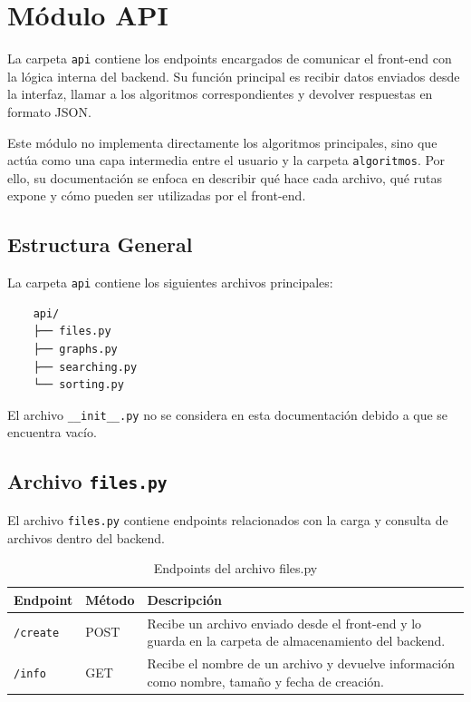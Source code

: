 \documentclass[12pt]{article}
\begin{document}

\section{Módulo API}

La carpeta \texttt{api} contiene los endpoints encargados de comunicar el front-end con la lógica interna del backend. Su función principal es recibir datos enviados desde la interfaz, llamar a los algoritmos correspondientes y devolver respuestas en formato JSON.

Este módulo no implementa directamente los algoritmos principales, sino que actúa como una capa intermedia entre el usuario y la carpeta \texttt{algoritmos}. Por ello, su documentación se enfoca en describir qué hace cada archivo, qué rutas expone y cómo pueden ser utilizadas por el front-end.

\subsection{Estructura General}

La carpeta \texttt{api} contiene los siguientes archivos principales:

\begin{verbatim}
	api/
	├── files.py
	├── graphs.py
	├── searching.py
	└── sorting.py
\end{verbatim}

El archivo \texttt{\_\_init\_\_.py} no se considera en esta documentación debido a que se encuentra vacío.

\subsection{Archivo \texttt{files.py}}

El archivo \texttt{files.py} contiene endpoints relacionados con la carga y consulta de archivos dentro del backend.

\begin{table}[H]
	\centering
	\begin{tabular}{|p{4cm}|p{4cm}|p{6cm}|}
		\hline
		\textbf{Endpoint} & \textbf{Método} & \textbf{Descripción} \\
		\hline
		\texttt{/create} & POST & Recibe un archivo enviado desde el front-end y lo guarda en la carpeta de almacenamiento del backend. \\
		\hline
		\texttt{/info} & GET & Recibe el nombre de un archivo y devuelve información como nombre, tamaño y fecha de creación. \\
		\hline
	\end{tabular}
	\caption{Endpoints del archivo files.py}
\end{table}
\end{document}
